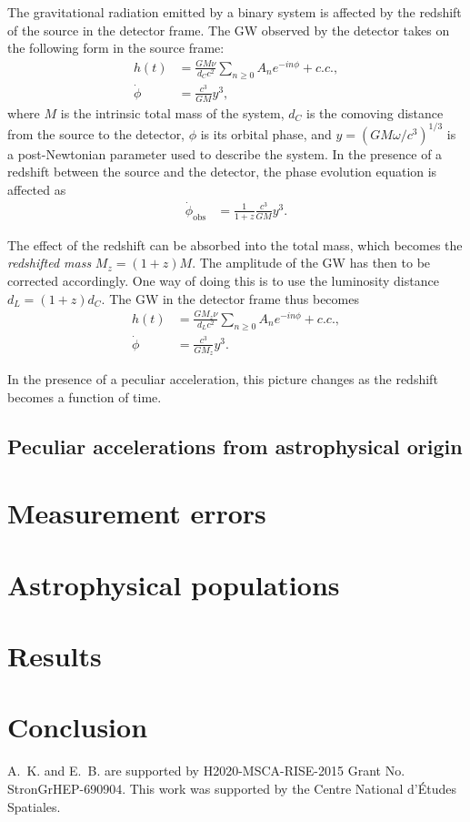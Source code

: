\documentclass[twocolumn,showpacs,preprintnumbers,nofootinbib,prd,
superscriptaddress,10pt]{revtex4-1}
\newcommand{\sub}[1]{_{\text{#1}}}
\begin{document}
The gravitational radiation emitted by a binary system is affected by the redshift
of the source in the detector frame. The GW observed by the detector takes on the following form in the 
source frame:
\begin{align}
 h(t) &= \frac{G M \nu}{d_C c^2} \sum_{n \geq 0} A_n e^{-i n \phi} + c.c., \\
  \dot{\phi} &= \frac{c^3}{G M} y^3,
\end{align}
where $M$ is the intrinsic total mass of the system, $d_C$ is the comoving distance 
from the source to the detector, $\phi$ is its orbital phase, and $y = (G M \omega / c^3)^{1/3}$ is a post-Newtonian parameter used to describe the system. In the presence of a redshift between the source and the detector, the phase evolution equation is affected as
\begin{align}
 \dot{\phi}\sub{obs} &= \frac{1}{1+z} \frac{c^3}{G M} y^3.
\end{align}

The effect of the redshift can be absorbed into the total mass, which becomes the \emph{redshifted mass} $M_z = (1+z) M$. The amplitude of the GW has then to be 
corrected accordingly. One way of doing this is to use the luminosity distance
$d_L = (1+z) d_C$. The GW in the detector frame thus becomes
\begin{align}
 h(t) &= \frac{G M_z \nu}{d_L c^2} \sum_{n \geq 0} A_n e^{-i n \phi} + c.c., \\
  \dot{\phi} &= \frac{c^3}{G M_z} y^3.
\end{align}

In the presence of a peculiar acceleration, this picture changes as the redshift becomes
a function of time.






\subsection{Peculiar accelerations from astrophysical origin}


\section{Measurement errors}




\section{Astrophysical populations}





\section{Results}





\section{Conclusion}




\acknowledgments


A.~K. and E.~B. are supported by H2020-MSCA-RISE-2015 Grant No. StronGrHEP-690904.
This work was 
supported by the Centre National d'{\'E}tudes Spatiales.




\end{document}
